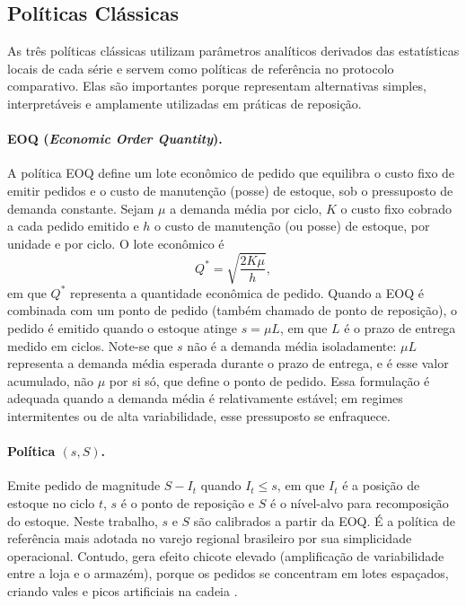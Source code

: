 \subsection{Políticas Clássicas}
\label{sec:politicas_classicas}

As três políticas clássicas utilizam parâmetros analíticos derivados das estatísticas locais de cada série e servem como políticas de referência no protocolo comparativo. Elas são importantes porque representam alternativas simples, interpretáveis e amplamente utilizadas em práticas de reposição.

\paragraph{EOQ (\textit{Economic Order Quantity}).}
A política EOQ define um lote econômico de pedido que equilibra o custo fixo de emitir pedidos e o custo de manutenção (posse) de estoque, sob o pressuposto de demanda constante. Sejam $\mu$ a demanda média por ciclo, $K$ o custo fixo cobrado a cada pedido emitido e $h$ o custo de manutenção (ou posse) de estoque, por unidade e por ciclo. O lote econômico é
\begin{equation}
Q^* = \sqrt{\frac{2K\mu}{h}},
\end{equation}
em que $Q^*$ representa a quantidade econômica de pedido. Quando a EOQ é combinada com um ponto de pedido (também chamado de ponto de reposição), o pedido é emitido quando o estoque atinge $s = \mu L$, em que $L$ é o prazo de entrega medido em ciclos. Note-se que $s$ não é a demanda média isoladamente: $\mu L$ representa a demanda média esperada durante o prazo de entrega, e é esse valor acumulado, não $\mu$ por si só, que define o ponto de pedido. Essa formulação é adequada quando a demanda média é relativamente estável; em regimes intermitentes ou de alta variabilidade, esse pressuposto se enfraquece.

\paragraph{Política $(s, S)$.}
Emite pedido de magnitude $S - I_t$ quando $I_t \leq s$, em que $I_t$ é a posição de estoque no ciclo $t$, $s$ é o ponto de reposição e $S$ é o nível-alvo para recomposição do estoque. Neste trabalho, $s$ e $S$ são calibrados a partir da EOQ. É a política de referência mais adotada no varejo regional brasileiro por sua simplicidade operacional. Contudo, gera efeito chicote elevado (amplificação de variabilidade entre a loja e o armazém), porque os pedidos se concentram em lotes espaçados, criando vales e picos artificiais na cadeia \citep{LeePadmanabhanWhang1997Bullwhip}.

